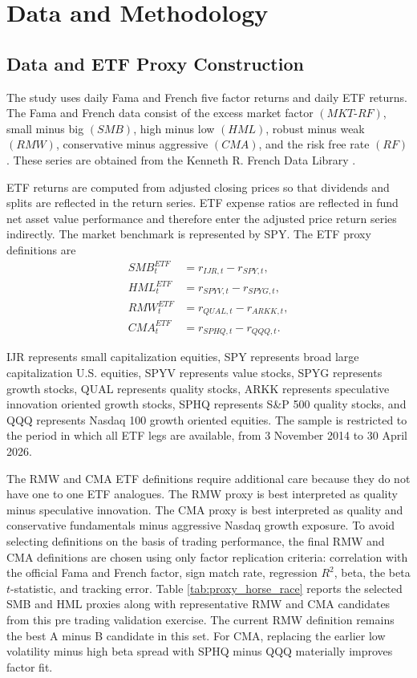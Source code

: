 \documentclass[investment,article,submit,pdftex,moreauthors]{Definitions/mdpi}
\begin{document}
\section{Data and Methodology}

\subsection{Data and ETF Proxy Construction}

The study uses daily Fama and French five factor returns and daily ETF returns. The Fama and French data consist of the excess market factor \((MKT\text{-}RF)\), small minus big \((SMB)\), high minus low \((HML)\), robust minus weak \((RMW)\), conservative minus aggressive \((CMA)\), and the risk free rate \((RF)\). These series are obtained from the Kenneth R. French Data Library \citep{frenchdatalibrary}.

ETF returns are computed from adjusted closing prices so that dividends and splits are reflected in the return series. ETF expense ratios are reflected in fund net asset value performance and therefore enter the adjusted price return series indirectly. The market benchmark is represented by SPY. The ETF proxy definitions are
\begin{align}
SMB^{ETF}_{t} &= r_{IJR,t} - r_{SPY,t}, \\
HML^{ETF}_{t} &= r_{SPYV,t} - r_{SPYG,t}, \\
RMW^{ETF}_{t} &= r_{QUAL,t} - r_{ARKK,t}, \\
CMA^{ETF}_{t} &= r_{SPHQ,t} - r_{QQQ,t}.
\end{align}

IJR represents small capitalization equities, SPY represents broad large capitalization U.S. equities, SPYV represents value stocks, SPYG represents growth stocks, QUAL represents quality stocks, ARKK represents speculative innovation oriented growth stocks, SPHQ represents S&P 500 quality stocks, and QQQ represents Nasdaq 100 growth oriented equities. The sample is restricted to the period in which all ETF legs are available, from 3 November 2014 to 30 April 2026.

The RMW and CMA ETF definitions require additional care because they do not have one to one ETF analogues. The RMW proxy is best interpreted as quality minus speculative innovation. The CMA proxy is best interpreted as quality and conservative fundamentals minus aggressive Nasdaq growth exposure. To avoid selecting definitions on the basis of trading performance, the final RMW and CMA definitions are chosen using only factor replication criteria: correlation with the official Fama and French factor, sign match rate, regression \(R^2\), beta, the beta \(t\)-statistic, and tracking error. Table \ref{tab:proxy_horse_race} reports the selected SMB and HML proxies along with representative RMW and CMA candidates from this pre trading validation exercise. The current RMW definition remains the best A minus B candidate in this set. For CMA, replacing the earlier low volatility minus high beta spread with SPHQ minus QQQ materially improves factor fit.
\end{document}
